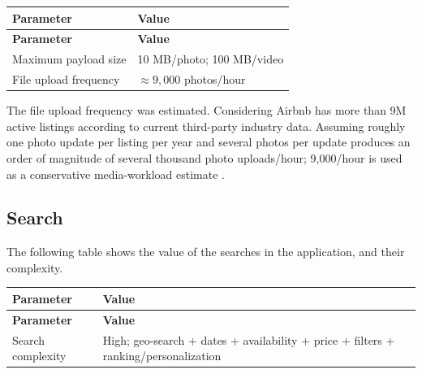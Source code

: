 \begin{longtable}{|p{}|p{}|}
    \hline
    \textbf{Parameter} & 
    \textbf{Value} \\
    \hline
    \endfirsthead

    \hline
    \textbf{Parameter} & 
    \textbf{Value} \\
    \hline
    \endhead
    
    Maximum payload size & 
    10 MB/photo; 100 MB/video \cite{airbnb_resource_center_photos, airbnb_help_video_verification}\\ 
    \hline 
    
    File upload frequency & 
    $\approx 9{,}000$ photos/hour \cite{searchlogistics_airbnb_statistics, airbnb_resource_center_photos}\\ 
    \hline 
    
\end{longtable}

The file upload frequency was estimated. Considering Airbnb has more than 9M active listings according to current 
third-party industry data. Assuming roughly one photo update per listing per year and several photos per update produces 
an order of magnitude of several thousand photo uploads/hour; 9,000/hour is used as a conservative media-workload estimate
\cite{searchlogistics_airbnb_statistics, airbnb_resource_center_photos}.

\subsection{Search}

The following table shows the value of the searches in the application, and their complexity.

\begin{longtable}{|p{}|p{}|}
    \hline
    \textbf{Parameter} & 
    \textbf{Value} \\
    \hline
    \endfirsthead

    \hline
    \textbf{Parameter} & 
    \textbf{Value} \\
    \hline
    \endhead
    
    Search complexity & 
    High; geo-search + dates + availability + price + filters + ranking/personalization
    \cite{educative_airbnb_system_design} \\ 
    \hline
    
\end{longtable}

